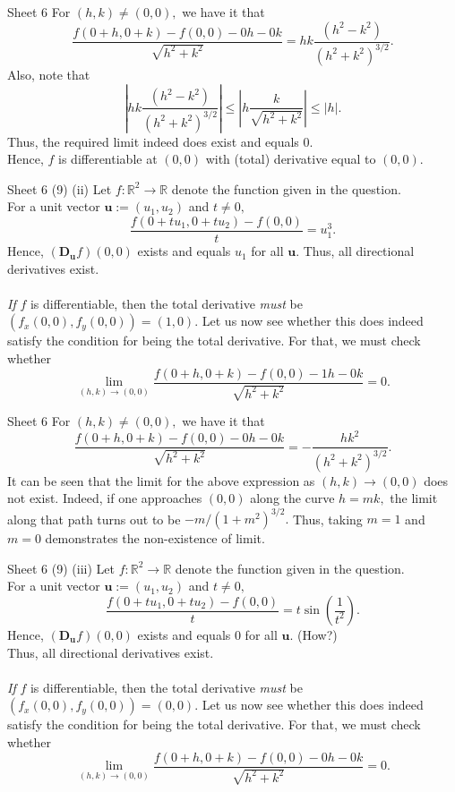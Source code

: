 \documentclass[handout, aspectratio=169]{beamer}
\begin{document}
\begin{frame}{Sheet 6}
	For $(h,k) \neq (0,0),$ we have it that
	\[\frac{f\left(0+h, 0+k\right)-f\left(0, 0\right)-0 h-0 k}{\sqrt{h^{2}+k^{2}}} = hk\frac{(h^2 - k^2)}{(h^2 + k^2)^{3/2}}.\]
	Also, note that
	\[\left|hk\frac{(h^2 - k^2)}{(h^2 + k^2)^{3/2}}\right| \le \left|h\frac{k}{\sqrt{h^2 + k^2}}\right| \le |h|.\]
	Thus, the required limit indeed does exist and equals $0.$\\
	Hence, $f$ is differentiable at $(0,0)$ with (total) derivative equal to $(0, 0).$
\end{frame}
\begin{frame}{Sheet 6}
	(9) (ii) Let $f:\mathbb{R}^2 \to \mathbb{R}$ denote the function given in the question.\\
	For a unit vector $\textbf{u} := (u_1, u_2)$ and $t \neq 0,$
	\[\frac{f\left(0+t u_{1}, 0+t u_{2}\right)-f(0,0)}{t} = u_1^3.\]
	Hence, $\left(\mathbf{D_u} f\right)(0,0)$ exists and equals $u_1$ for all $\textbf{u}.$ Thus, all directional derivatives exist.\\~\\
	\emph{If} $f$ is differentiable, then the total derivative \emph{must} be $(f_x(0, 0), f_y(0, 0)) = (1, 0).$ Let us now see whether this does indeed satisfy the condition for being the total derivative. For that, we must check whether
	\[\lim _{(h, k) \rightarrow(0,0)} \frac{f\left(0+h, 0+k\right)-f\left(0, 0\right)-1 h-0 k}{\sqrt{h^{2}+k^{2}}}=0.\]
\end{frame}
\begin{frame}{Sheet 6}
	For $(h,k) \neq (0,0),$ we have it that
	\[\frac{f\left(0+h, 0+k\right)-f\left(0, 0\right)-0 h-0 k}{\sqrt{h^{2}+k^{2}}} = -\frac{hk^2}{(h^2 + k^2)^{3/2}}.\]
	It can be seen that the limit for the above expression as $(h, k) \to (0, 0)$ does not exist. Indeed, if one approaches $(0, 0)$ along the curve $h = mk,$ the limit along that path turns out to be $-m/(1 + m^2)^{3/2}.$ Thus, taking $m = 1$ and $m = 0$ demonstrates the non-existence of limit.
\end{frame}
\begin{frame}{Sheet 6}
	(9) (iii) Let $f:\mathbb{R}^2 \to \mathbb{R}$ denote the function given in the question.\\
	For a unit vector $\textbf{u} := (u_1, u_2)$ and $t \neq 0,$
	\[\frac{f\left(0+t u_{1}, 0+t u_{2}\right)-f(0,0)}{t} = t\sin\left(\frac{1}{t^2}\right).\]
	Hence, $\left(\mathbf{D_u} f\right)(0,0)$ exists and equals $0$ for all $\textbf{u}.$ \hfill (How?)\\
	Thus, all directional derivatives exist.\\~\\
	\emph{If} $f$ is differentiable, then the total derivative \emph{must} be $(f_x(0, 0), f_y(0, 0)) = (0, 0).$ Let us now see whether this does indeed satisfy the condition for being the total derivative. For that, we must check whether
	\[\lim _{(h, k) \rightarrow(0,0)} \frac{f\left(0+h, 0+k\right)-f\left(0, 0\right)-0 h-0 k}{\sqrt{h^{2}+k^{2}}}=0.\]
\end{frame}
\end{document}
